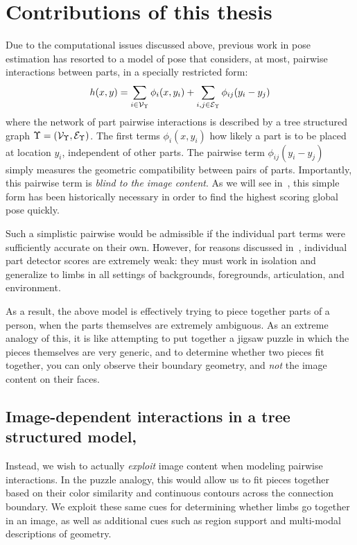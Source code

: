 
\section{Contributions of this thesis}

Due to the computational issues discussed above, previous work in pose 
estimation has resorted to a model of pose that considers, at most, pairwise 
interactions between parts, in a specially restricted form:
$$ h(x,y) =  \sum_{i \in \mathcal{V}_{\Upsilon}} \phi_i(x,y_i) + \sum_{i,j \in 
\mathcal{E}_{\Upsilon}} \phi_{ij}(y_i - y_j) $$
where the network of part pairwise interactions is described by a tree 
structured graph $\Upsilon = (\mathcal{V}_\Upsilon,\mathcal{E}_\Upsilon)$.  The first terms 
$\phi_i(x,y_i)$ how likely a part is to be placed at location $y_i$, 
independent of other parts.  The pairwise term $\phi_{ij}(y_i-y_j)$ simply 
measures the geometric compatibility between pairs of parts.  Importantly, this 
pairwise term is {\em blind to the image content}.  As we will see 
in~, this simple form has been historically necessary in order to 
find the highest scoring global pose quickly.

Such a simplistic pairwise would be admissible if the individual part terms 
were sufficiently accurate on their own.  However, for reasons discussed 
in~, individual part detector scores are extremely weak: 
they must work in isolation and generalize to limbs in all settings of 
backgrounds, foregrounds, articulation, and environment.

As a result, the above model is effectively trying to piece together parts of a 
person, when the parts themselves are extremely ambiguous. As an extreme 
analogy of this, it is like attempting to put together a jigsaw puzzle in which 
the pieces themselves are very generic, and to determine whether two pieces fit 
together, you can only observe their boundary geometry, and {\em not } the  
image content on their faces.


\subsection{Image-dependent interactions in a tree structured 
model,~}
\label{sec:contrib1}
Instead, we wish to actually {\em exploit } image content when modeling 
pairwise interactions.  In the puzzle analogy, this would allow us to fit 
pieces together based on their color similarity and continuous contours across 
the connection boundary.  We exploit these same cues for determining whether 
limbs go together in an image, as well as additional cues such as region 
support and multi-modal descriptions of geometry.


